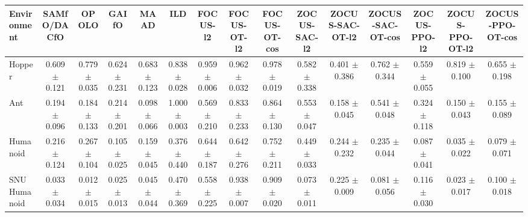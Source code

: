 \begin{tabular}{lcccccccccccccc}
\toprule
Environment & SAMfO/DACfO & OPOLO & GAIfO & MAAD & ILD & FOCUS-l2 & FOCUS-OT-l2 & FOCUS-OT-cos & ZOCUS-SAC-l2 & ZOCUS-SAC-OT-l2 & ZOCUS-SAC-OT-cos & ZOCUS-PPO-l2 & ZOCUS-PPO-OT-l2 & ZOCUS-PPO-OT-cos \\
\midrule
Hopper & 0.609 $\pm$ 0.121 & 0.779 $\pm$ 0.035 & 0.624 $\pm$ 0.231 & 0.683 $\pm$ 0.123 & 0.838 $\pm$ 0.028 & 0.959 $\pm$ 0.006 & 0.962 $\pm$ 0.032 & 0.978 $\pm$ 0.019 & 0.582 $\pm$ 0.338 & 0.401 $\pm$ 0.386 & 0.762 $\pm$ 0.344 & 0.559 $\pm$ 0.055 & 0.819 $\pm$ 0.100 & 0.655 $\pm$ 0.198 \\
Ant & 0.194 $\pm$ 0.096 & 0.184 $\pm$ 0.133 & 0.214 $\pm$ 0.201 & 0.098 $\pm$ 0.066 & 1.000 $\pm$ 0.003 & 0.569 $\pm$ 0.210 & 0.833 $\pm$ 0.233 & 0.864 $\pm$ 0.130 & 0.553 $\pm$ 0.047 & 0.158 $\pm$ 0.045 & 0.541 $\pm$ 0.048 & 0.324 $\pm$ 0.118 & 0.150 $\pm$ 0.043 & 0.155 $\pm$ 0.089 \\
Humanoid & 0.216 $\pm$ 0.124 & 0.267 $\pm$ 0.104 & 0.105 $\pm$ 0.025 & 0.159 $\pm$ 0.045 & 0.376 $\pm$ 0.440 & 0.644 $\pm$ 0.187 & 0.642 $\pm$ 0.276 & 0.752 $\pm$ 0.211 & 0.449 $\pm$ 0.033 & 0.244 $\pm$ 0.232 & 0.235 $\pm$ 0.044 & 0.087 $\pm$ 0.041 & 0.035 $\pm$ 0.022 & 0.079 $\pm$ 0.071 \\
SNU Humanoid & 0.033 $\pm$ 0.034 & 0.012 $\pm$ 0.015 & 0.025 $\pm$ 0.013 & 0.045 $\pm$ 0.044 & 0.470 $\pm$ 0.369 & 0.558 $\pm$ 0.225 & 0.938 $\pm$ 0.007 & 0.909 $\pm$ 0.020 & 0.073 $\pm$ 0.011 & 0.225 $\pm$ 0.009 & 0.081 $\pm$ 0.056 & 0.116 $\pm$ 0.030 & 0.023 $\pm$ 0.017 & 0.100 $\pm$ 0.018 \\
\bottomrule
\end{tabular}
